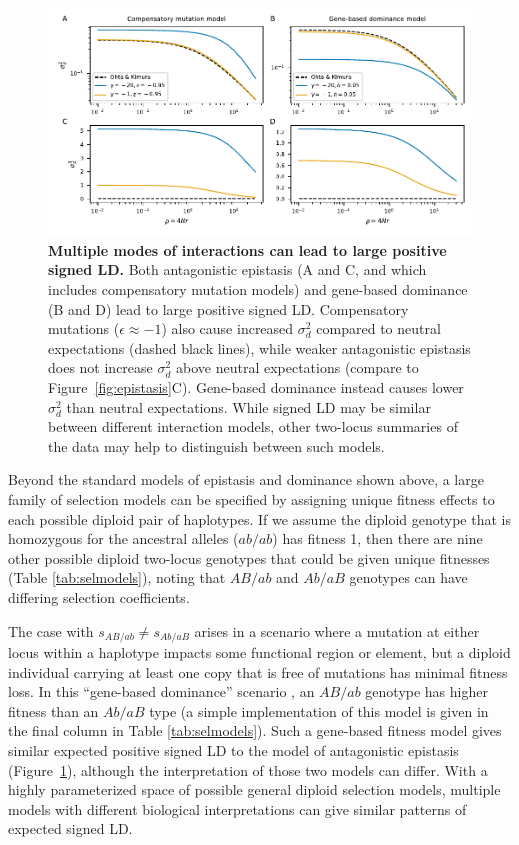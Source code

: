 \documentclass[]{article}
\begin{document}
\begin{figure}[tb!]
    \internallinenumbers
    \centering
    \includegraphics{../figures/gene-based-compensatory}
    \caption{
        \textbf{Multiple modes of interactions can lead to large positive signed LD.}
        Both antagonistic epistasis (A and C, and which includes compensatory mutation
        models) and gene-based dominance (B and D) lead to large positive signed LD.
        Compensatory mutations (\(\epsilon \approx -1\)) also cause increased
        \(\sigma_d^2\) compared to neutral expectations (dashed black lines),
        while weaker antagonistic epistasis does not increase \(\sigma_d^2\) above
        neutral expectations (compare to Figure~\ref{fig:epistasis}C).
        Gene-based dominance instead causes lower \(\sigma_d^2\) than neutral
        expectations.
        While signed LD may be similar between different interaction models,
        other two-locus summaries of the data may help to distinguish between
        such models.
        }
    \label{fig:gene-based-compensatory}
\end{figure}

Beyond the standard models of epistasis and dominance shown above, a large
family of selection models can be specified by assigning unique fitness effects
to each possible diploid pair of haplotypes. If we assume the diploid genotype
that is homozygous for the ancestral alleles (\(ab/ab\)) has fitness 1, then
there are nine other possible diploid two-locus genotypes that could be given
unique fitnesses (Table \ref{tab:selmodels}), noting that \(AB/ab\) and
\(Ab/aB\) genotypes can have differing selection coefficients.

The case with \(s_{AB/ab} \not= s_{Ab/aB}\) arises in a scenario where a
mutation at either locus within a haplotype impacts some functional region or
element, but a diploid individual carrying at least one copy that is free of
mutations has minimal fitness loss. In this ``gene-based dominance'' scenario
\citep[e.g.,][]{Sanjak2017-zw}, an \(AB/ab\) genotype has higher fitness than
an \(Ab/aB\) type (a simple implementation of this model is given in the final
column in Table \ref{tab:selmodels}). Such a gene-based fitness model gives
similar expected positive signed LD to the model of antagonistic epistasis
(Figure~\ref{fig:gene-based-compensatory}), although the interpretation of
those two models can differ. With a highly parameterized space of possible
general diploid selection models, multiple models with different biological
interpretations can give similar patterns of expected signed LD.
\end{document}
